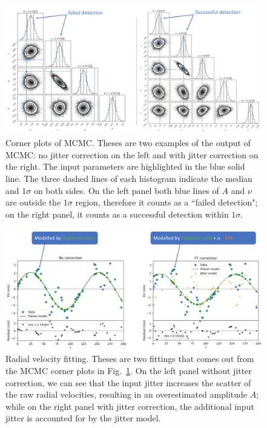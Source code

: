\begin{figure}[tbp]
\centering
\includegraphics[width = 0.99 \linewidth]
{./Figures/Methods/Corner.png}
\caption[Corner plots of MCMC]
{Corner plots of MCMC. Theses are two examples of the output of MCMC: no jitter correction on the left and 
with jitter correction on the right. The input parameters are highlighted in the 
blue solid line. The three dashed lines of each histogram indicate the median and $1\sigma$ on both sides. On the 
left panel both blue lines of $A$ and $\nu$ are outside the $1\sigma$ region, therefore it counts as a ``failed detection";
on the right panel, it counts as a successful detection within $1\sigma$.}
\label{fig:Corner}
\end{figure} 

\begin{figure}[tbp]
\centering
\includegraphics[width = 0.99 \linewidth]
{./Figures/Methods/Fitting.png}
\caption[Planet recovery]
{Radial velocity fitting. Theses are two fittings that comes out from the MCMC corner plots in Fig.~\ref{fig:Corner}. 
On the left panel without jitter correction, we can see that the input jitter increases the scatter of the raw radial 
velocities, resulting in an overestimated amplitude $A$; while on the right panel with jitter correction, the additional 
input jitter is accounted for by the jitter model.}
\label{fig:Planet_recovery}
\end{figure} 

